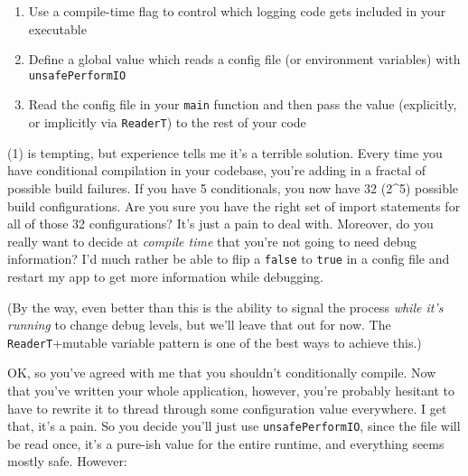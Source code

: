 \begin{enumerate}

\item
  Use a compile-time flag to control which logging code gets included in
  your executable
\item
  Define a global value which reads a config file (or environment
  variables) with \texttt{unsafePerformIO}
\item
  Read the config file in your \texttt{main} function and then pass the
  value (explicitly, or implicitly via \texttt{ReaderT}) to the rest of
  your code
\end{enumerate}
(1) is tempting, but experience tells me it's a terrible solution. Every
time you have conditional compilation in your codebase, you're adding in
a fractal of possible build failures. If you have 5 conditionals, you
now have 32 (2\^{}5) possible build configurations. Are you sure you
have the right set of import statements for all of those 32
configurations? It's just a pain to deal with. Moreover, do you really
want to decide at \emph{compile time} that you're not going to need
debug information? I'd much rather be able to flip a \texttt{false} to
\texttt{true} in a config file and restart my app to get more
information while debugging.

(By the way, even better than this is the ability to signal the process
\emph{while it's running} to change debug levels, but we'll leave that
out for now. The \texttt{ReaderT}+mutable variable pattern is one of the
best ways to achieve this.)

OK, so you've agreed with me that you shouldn't conditionally compile.
Now that you've written your whole application, however, you're probably
hesitant to have to rewrite it to thread through some configuration
value everywhere. I get that, it's a pain. So you decide you'll just use
\texttt{unsafePerformIO}, since the file will be read once, it's a
pure-ish value for the entire runtime, and everything seems mostly safe.
However:

